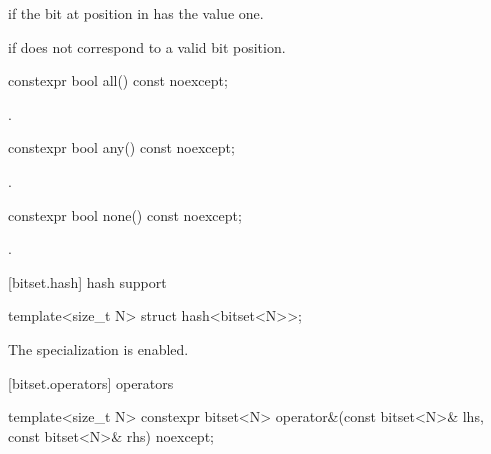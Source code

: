 \begin{itemdescr}
\pnum
\returns
{}
if the bit at position 
in
has the value one.

\pnum
\throws
{}%
 if  does not correspond to a valid bit position.
\end{itemdescr}

%
\begin{itemdecl}
constexpr bool all() const noexcept;
\end{itemdecl}

\begin{itemdescr}
\pnum
\returns
{}.
\end{itemdescr}

%
%
\begin{itemdecl}
constexpr bool any() const noexcept;
\end{itemdecl}

\begin{itemdescr}
\pnum
\returns
{}.
\end{itemdescr}

%
\begin{itemdecl}
constexpr bool none() const noexcept;
\end{itemdecl}

\begin{itemdescr}
\pnum
\returns
{}.
\end{itemdescr}

[bitset.hash]{ hash support}

%
\begin{itemdecl}
template<size_t N> struct hash<bitset<N>>;
\end{itemdecl}

\begin{itemdescr}
\pnum
The specialization is enabled.
\end{itemdescr}


[bitset.operators]{ operators}

%
\begin{itemdecl}
template<size_t N>
  constexpr bitset<N> operator&(const bitset<N>& lhs, const bitset<N>& rhs) noexcept;
\end{itemdecl}

